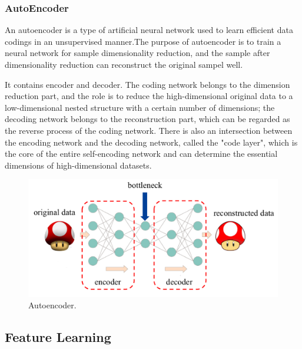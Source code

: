 \documentclass{article}
\begin{document}
\subsubsection{AutoEncoder}
\indent An autoencoder is a type of artificial neural network used to learn efficient data codings in an unsupervised manner.\cite{kramer1991nonlinear}The purpose of autoencoder is to train a neural network for sample dimensionality reduction, and the sample after dimensionality reduction can reconstruct the original sampel well. \par
\indent It contains encoder and decoder. The coding network belongs to the dimension reduction part, and the role is to reduce the high-dimensional original data to a low-dimensional nested structure with a certain number of dimensions; the decoding network belongs to the reconstruction part, which can be regarded as the reverse process of the coding network. There is also an intersection between the encoding network and the decoding network, called the "code layer", which is the core of the entire self-encoding network  and can determine the essential dimensions of high-dimensional datasets.
\begin{figure}[htbp]
	\centering
	\includegraphics[scale=0.2]{figure/Autoencoder.jpg}
	\caption{Autoencoder.}
	\label{fig:autoencoder}
\end{figure}\par
\subsection{Feature Learning}
\end{document}
